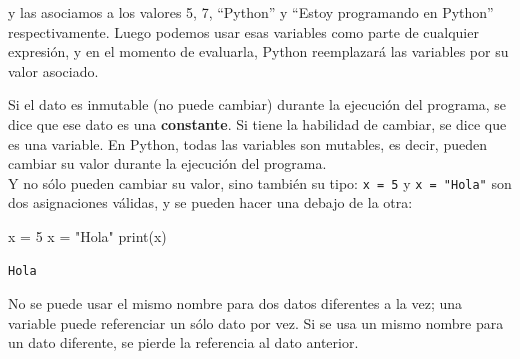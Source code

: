 \documentclass[
  letterpaper,
  DIV=11,
  numbers=noendperiod]{scrreprt}
\newenvironment{Shaded}{\begin{snugshade}}{\end{snugshade}}
\newcommand{\BuiltInTok}[1]{\textcolor[rgb]{0.00,0.23,0.31}{#1}}
\newcommand{\DecValTok}[1]{\textcolor[rgb]{0.68,0.00,0.00}{#1}}
\newcommand{\NormalTok}[1]{\textcolor[rgb]{0.00,0.23,0.31}{#1}}
\newcommand{\OperatorTok}[1]{\textcolor[rgb]{0.37,0.37,0.37}{#1}}
\newcommand{\StringTok}[1]{\textcolor[rgb]{0.13,0.47,0.30}{#1}}
\begin{document}
y las asociamos a los valores 5, 7, ``Python'' y ``Estoy programando en
Python'' respectivamente. Luego podemos usar esas variables como parte
de cualquier expresión, y en el momento de evaluarla, Python reemplazará
las variables por su valor asociado.

\begin{tcolorbox}[enhanced jigsaw, arc=.35mm, toptitle=1mm, colframe=quarto-callout-note-color-frame, bottomtitle=1mm, opacitybacktitle=0.6, colbacktitle=quarto-callout-note-color!10!white, leftrule=.75mm, coltitle=black, toprule=.15mm, titlerule=0mm, title=\textcolor{quarto-callout-note-color}{\faInfo}\hspace{0.5em}{Variables y Constantes}, bottomrule=.15mm, rightrule=.15mm, colback=white, breakable, opacityback=0, left=2mm]

Si el dato es inmutable (no puede cambiar) durante la ejecución del
programa, se dice que ese dato es una \textbf{constante}. Si tiene la
habilidad de cambiar, se dice que es una variable. En Python, todas las
variables son mutables, es decir, pueden cambiar su valor durante la
ejecución del programa.\\
Y no sólo pueden cambiar su valor, sino también su tipo:
\texttt{x\ =\ 5} y \texttt{x\ =\ "Hola"} son dos asignaciones válidas, y
se pueden hacer una debajo de la otra:

\begin{Shaded}
\begin{Highlighting}[]
\NormalTok{x }\OperatorTok{=} \DecValTok{5}
\NormalTok{x }\OperatorTok{=} \StringTok{"Hola"}
\BuiltInTok{print}\NormalTok{(x)}
\end{Highlighting}
\end{Shaded}

\begin{verbatim}
Hola
\end{verbatim}

\end{tcolorbox}

\begin{tcolorbox}[enhanced jigsaw, arc=.35mm, toptitle=1mm, colframe=quarto-callout-warning-color-frame, bottomtitle=1mm, opacitybacktitle=0.6, colbacktitle=quarto-callout-warning-color!10!white, leftrule=.75mm, coltitle=black, toprule=.15mm, titlerule=0mm, title=\textcolor{quarto-callout-warning-color}{\faExclamationTriangle}\hspace{0.5em}{Nombres de Variables}, bottomrule=.15mm, rightrule=.15mm, colback=white, breakable, opacityback=0, left=2mm]

No se puede usar el mismo nombre para dos datos diferentes a la vez; una
variable puede referenciar un sólo dato por vez. Si se usa un mismo
nombre para un dato diferente, se pierde la referencia al dato
anterior.\\

\end{tcolorbox}
\end{document}
